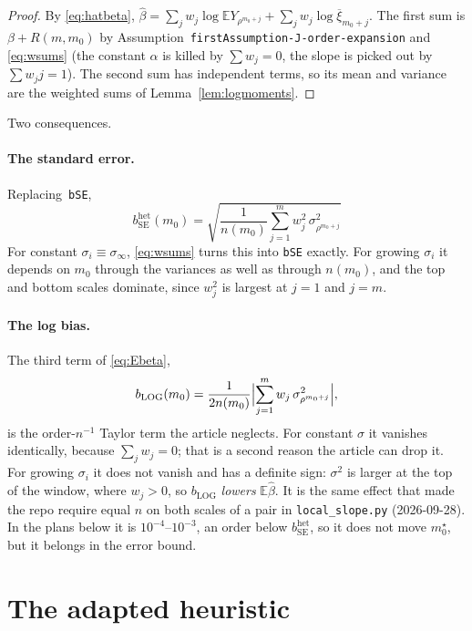 \documentclass[11pt]{article}
\newcommand{\E}{\mathbb{E}}
\newcommand{\bSE}{b_{\mathrm{SE}}}
\newcommand{\bLOG}{b_{\mathrm{LOG}}}
\begin{document}
\begin{proof}
By \eqref{eq:hatbeta}, $\hat\beta=\sum_jw_j\log\E Y_{\rho^{m_0+j}}+\sum_jw_j\log\overline\xi_{m_0+j}$.
The first sum is $\beta+R(m,m_0)$ by Assumption~\texttt{firstAssumption-J-order-expansion}
and \eqref{eq:wsums} (the constant $\alpha$ is killed by $\sum w_j=0$, the slope
is picked out by $\sum w_jj=1$). The second sum has independent terms, so its
mean and variance are the weighted sums of Lemma~\ref{lem:logmoments}.
\end{proof}

\noindent Two consequences.

\paragraph{The standard error.} Replacing~\texttt{bSE},
\begin{equation}
  \boxed{\;
  \bSE^{\mathrm{het}}(m_0)=\sqrt{\frac{1}{n(m_0)}\sum_{j=1}^m w_j^2\,\sigma_{\rho^{m_0+j}}^2}\;}
  \label{eq:bSEhet}
\end{equation}
For constant $\sigma_i\equiv\sigma_\infty$, \eqref{eq:wsums} turns this into
\texttt{bSE} exactly. For growing $\sigma_i$ it depends on $m_0$ through the
variances as well as through $n(m_0)$, and the top and bottom scales dominate,
since $w_j^2$ is largest at $j=1$ and $j=m$.

\paragraph{The log bias.} The third term of \eqref{eq:Ebeta},
\begin{equation}
  \bLOG(m_0)=\frac{1}{2n(m_0)}\Bigl|\sum_{j=1}^m w_j\,\sigma_{\rho^{m_0+j}}^2\Bigr|,
  \label{eq:bLOG}
\end{equation}
is the order-$n^{-1}$ Taylor term the article neglects. For constant $\sigma$
it vanishes identically, because $\sum_jw_j=0$; that is a second reason the
article can drop it. For growing $\sigma_i$ it does not vanish and has a
definite sign: $\sigma^2$ is larger at the top of the window, where $w_j>0$, so
$\bLOG$ \emph{lowers} $\E\hat\beta$. It is the same effect that made the repo
require equal $n$ on both scales of a pair in \texttt{local\_slope.py}
(2026-09-28). In the plans below it is $10^{-4}$--$10^{-3}$, an order below
$\bSE^{\mathrm{het}}$, so it does not move $m_0^\star$, but it belongs in the
error bound.

\section{The adapted heuristic}
\end{document}
